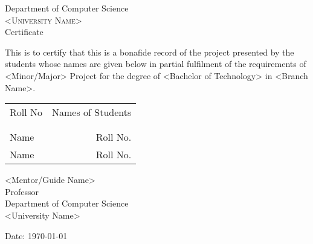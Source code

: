 

\newpage
\thispagestyle{empty}

\begin{center}

\huge{Department of Computer Science}\\[0.5cm]
\normalsize
\textsc{<University Name>}\\[2.0cm]

\LARGE Certificate\\[2.5cm]
\end{center}
\normalsize This is to certify that this is a bonafide record of the project presented by the students whose names are given below in partial fulfilment of the requirements of <Minor/Major> Project for the degree of <Bachelor of Technology> in <Branch Name>.\\[1.0cm]

\begin{table}[h]
\centering
\begin{tabular}{lr}
Roll No & Names of Students \\ \\ \hline
\\
Name & Roll No. \\ 
Name & Roll No. \\
\end{tabular}
\end{table}

\vfill


\begin{flushright}
<Mentor/Guide Name>\\
Professor\\
Department of Computer Science\\
<University Name>\\
\end{flushright}

\begin{flushleft}
Date: \today
\end{flushleft}